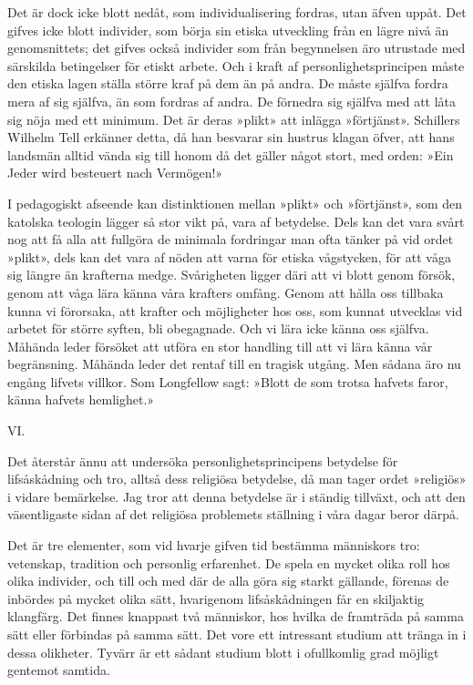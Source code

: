 \documentclass[12pt]{article}
\newcommand{\opage}[1]{\marginnote{\footnotesize\textit{[#1]}}}
\begin{document}
Det är dock icke blott nedåt, som individualisering fordras, utan äfven uppåt. Det gifves icke blott individer, som börja sin etiska utveckling från en lägre nivå än genomsnittets; det gifves också individer som från begynnelsen äro utrustade med särskilda betingelser för etiskt arbete. Och i kraft af personlighetsprincipen måste den etiska lagen ställa större kraf på dem än på andra. De måste själfva fordra mera af sig själfva, än som fordras af andra. De förnedra sig själfva med att låta sig nöja med ett minimum. Det är deras »plikt» att inlägga »förtjänst». Schillers Wilhelm Tell erkänner detta, då han besvarar sin hustrus klagan öfver, att hans landsmän alltid vända sig till honom då det gäller något stort, med orden: »Ein Jeder wird besteuert nach Vermögen!»

I pedagogiskt afseende kan distinktionen mellan »plikt» och »förtjänst», som %
\opage{59}
den katolska teologin lägger så stor vikt på, vara af betydelse. Dels kan det vara svårt nog att få alla att fullgöra de minimala fordringar man ofta tänker på vid ordet »plikt», dels kan det vara af nöden att varna för etiska vågstycken, för att våga sig längre än krafterna medge. Svårigheten ligger däri att vi blott genom försök, genom att våga lära känna våra krafters omfång. Genom att hålla oss tillbaka kunna vi förorsaka, att krafter och möjligheter hos oss, som kunnat utvecklas vid arbetet för större syften, bli obegagnade. Och vi lära icke känna oss själfva. Måhända leder försöket att utföra en stor handling till att vi lära känna vår begränsning. Måhända leder det rentaf till en tragisk utgång. Men sådana äro nu engång lifvets villkor. Som Longfellow sagt: »Blott de som trotsa hafvets faror, känna hafvets hemlighet.» %
\opage{60}
\begin{center}\large VI.\end{center}

Det återstår ännu att undersöka personlighetsprincipens betydelse för  lifsåskådning och tro, alltså dess religiösa betydelse, då man tager ordet »religiös» i vidare bemärkelse. Jag tror att denna betydelse är i ständig tillväxt, och att den väsentligaste sidan af det religiösa problemets ställning i våra dagar beror därpå.

Det är tre elementer, som vid hvarje gifven tid bestämma människors tro: vetenskap, tradition och personlig erfarenhet. De spela en mycket olika roll hos olika individer, och till och med där de alla göra sig starkt gällande, förenas de inbördes på mycket olika sätt, hvarigenom lifsåskådningen får en skiljaktig klangfärg. Det finnes knappast två människor, hos hvilka de framträda på samma sätt eller förbindas på samma sätt. Det vore %
\opage{61}
ett intressant studium att tränga in i dessa olikheter. Tyvärr är ett sådant studium blott i ofullkomlig grad möjligt gentemot samtida.
\end{document}
